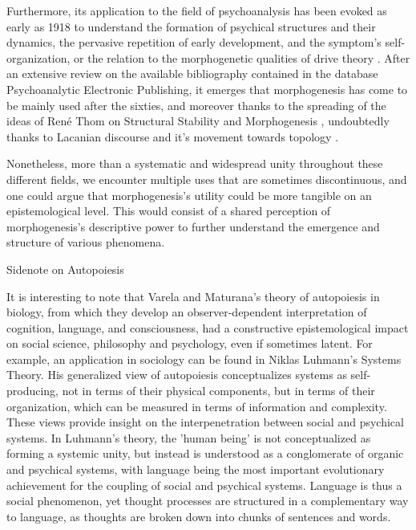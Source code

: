 \documentclass[fleqn,10pt]{wlscirep}
\begin{document}
Furthermore, its application to the field of psychoanalysis has been evoked as early as 1918 to understand the formation of psychical structures and their dynamics, the pervasive repetition of early development, and the symptom’s self-organization, or the relation to the morphogenetic qualities of drive theory \cite{benedek1973instinct}. After an extensive review on the available bibliography contained in the database Psychoanalytic Electronic Publishing, it emerges that morphogenesis has come to be mainly used after the sixties, and moreover thanks to the spreading of the ideas of René Thom on Structural Stability and Morphogenesis \cite{de_luca_picione_processes_2016}, undoubtedly thanks to Lacanian discourse and it’s movement towards topology \cite{nasio_five_1998}. 

Nonetheless, more than a systematic and widespread unity throughout these different fields, we encounter multiple uses that are sometimes discontinuous, and one could argue that morphogenesis’s utility could be more tangible on an epistemological level. This would consist of a shared perception of morphogenesis’s descriptive power to further understand the emergence and structure of various phenomena.

Sidenote on Autopoiesis

It is interesting to note that Varela and Maturana’s theory of autopoiesis in biology, from which they develop an observer-dependent interpretation of cognition, language, and consciousness, had a constructive epistemological impact on social science, philosophy and psychology, even if sometimes latent. For example, an application in sociology can be found in Niklas Luhmann's Systems Theory. His generalized view of autopoiesis conceptualizes systems as self-producing, not in terms of their physical components, but in terms of their organization, which can be measured in terms of information and complexity\cite{gershenson_requisite_2014}. These views provide insight on the interpenetration between social and psychical systems. In Luhmann's theory, the 'human being' is not conceptualized as forming a systemic unity, but instead is understood as a conglomerate of organic and psychical systems, with language being the most important evolutionary achievement for the coupling of social and psychical systems. Language is thus a social phenomenon, yet thought processes are structured in a complementary way to language, as thoughts are broken down into chunks of sentences and words. \cite{seidl_luhmanns_2004}
\end{document}
